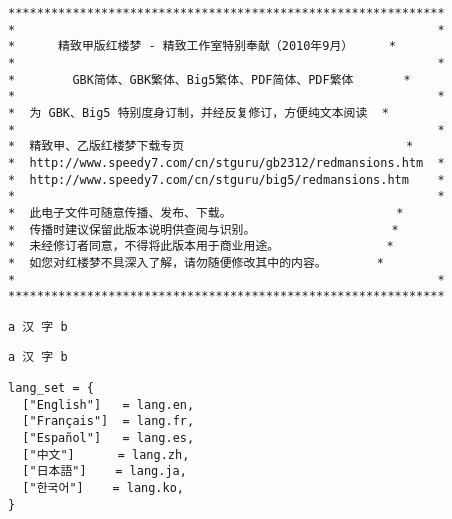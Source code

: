 \documentclass[a4paper]{article}
\begin{document}
\begin{verbatim}
*************************************************************
*                                                           *
*      精致甲版红楼梦 - 精致工作室特别奉献（2010年9月）     *
*                                                           *
*        GBK简体、GBK繁体、Big5繁体、PDF简体、PDF繁体       *
*                                                           *
*  为 GBK、Big5 特别度身订制，并经反复修订，方便纯文本阅读  *
*                                                           *
*  精致甲、乙版红楼梦下载专页                               *
*  http://www.speedy7.com/cn/stguru/gb2312/redmansions.htm  *
*  http://www.speedy7.com/cn/stguru/big5/redmansions.htm    *
*                                                           *
*  此电子文件可随意传播、发布、下载。                       *
*  传播时建议保留此版本说明供查阅与识别。                   *
*  未经修订者同意，不得将此版本用于商业用途。               *
*  如您对红楼梦不具深入了解，请勿随便修改其中的内容。       *
*                                                           *
*************************************************************
\end{verbatim}

\verb|a 汉 字 b|

\verb*|a 汉 字 b|

\begin{verbatim}
lang_set = {
  ["English"]   = lang.en,
  ["Français"]  = lang.fr,
  ["Español"]   = lang.es,
  ["中文"]      = lang.zh,
  ["日本語"]    = lang.ja,
  ["한국어"]    = lang.ko,
}
\end{verbatim}
\end{document}
